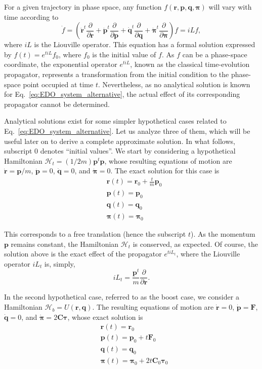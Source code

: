 \documentclass[aip,jcp,reprint,amsmath,amssymb,amsfont]{revtex4-1}
\newcommand{\mt}[1]{\boldsymbol{\mathbf{#1}}}           %
\newcommand{\vt}[1]{\boldsymbol{\mathbf{#1}}}           %
\newcommand{\tr}[1]{#1^t}                               %
\newcommand{\diff}[2]{\dfrac{\partial #1}{\partial #2}} %
\begin{document}
For a given trajectory in phase space, any function $f(\vt r, \vt p, \vt q, \vt \pi)$ will vary with time according to
\[
\dot{f} = \left( \tr{\dot{\vt r}} \diff{}{\vt r} + \tr{\dot{\vt p}} \diff{}{\vt p} + \tr{\dot{\vt q}} \diff{}{\vt q} + \tr{\dot{\vt \pi}} \diff{}{\vt \pi} \right) f = i\!L f,
\]
where $i\!L$ is the Liouville operator. This equation has a formal solution expressed by $f(t) = e^{t i\!L}f_0$, where $f_0$ is the initial value of $f$. As $f$ can be a phase-space coordinate, the exponential operator $e^{t i\!L}$, known as the classical time-evolution propagator,\cite{Tuckerman2008} represents a transformation from the initial condition to the phase-space point occupied at time $t$. Nevertheless, as no analytical solution is known for Eq.~\ref{eq:EDO_system_alternative}, the actual effect of its corresponding propagator cannot be determined.

Analytical solutions exist for some simpler hypothetical cases related to Eq.~\ref{eq:EDO_system_alternative}. Let us analyze three of them, which will be useful later on to derive a complete approximate solution. In what follows, subscript $0$ denotes ``initial values''. We start by considering a hypothetical Hamiltonian $\mathcal{H}_t = (1/2m) \tr{\vt p} \vt p$, whose resulting equations of motion are $\dot{\vt r} = {\vt p}/m$, $\dot{\vt p} = 0$, $\dot{\vt q} = 0$, and $\dot{\vt \pi} = 0$. The exact solution for this case is
\begin{align*}
&{\vt r}(t) = {\vt r}_0 + \frac{t}{m} {\vt p}_0 \\
&{\vt p}(t) = {\vt p}_0 \\
&{\vt q}(t) = {\vt q}_0 \\
&{\vt \pi}(t) = {\vt \pi}_0
\end{align*}

This corresponds to a free translation (hence the subscript $t$). As the momentum $\vt p$ remains constant, the Hamiltonian $\mathcal{H}_t$ is conserved, as expected. Of course, the solution above is the exact effect of the propagator $e^{t i\!L_t}$, where the Liouville operator $i\!L_t$ is, simply,
\[
i L_t = \frac{\tr{\vt p}}{m}\diff{}{\vt r}.
\]

In the second hypothetical case, referred to as the boost case, we consider a Hamiltonian $\mathcal{H}_b = U(\vt r, \vt q)$. The resulting equations of motion are $\dot{\vt r} = 0$, $\dot{\vt p} = \vt F$, $\dot{\vt q} = 0$, and $\dot{\vt \pi} = 2 \mt C \vt \tau$, whose exact solution is
\begin{align*}
&{\vt r}(t) = {\vt r}_0 \\
&{\vt p}(t) = {\vt p}_0 + t \vt F_0 \\
&{\vt q}(t) = {\vt q}_0 \\
&{\vt \pi}(t) = {\vt \pi}_0 +  2 t \mt C_0 \vt \tau_0
\end{align*}
\end{document}
